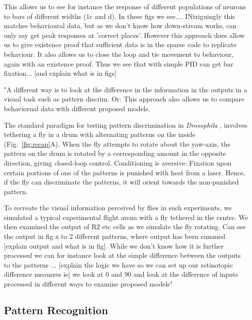 This allows us to see for instance the response of different populations of neurons to bars of different widths (1c and d). In these figs we see.... INtriguingly this matches behavioural data, 
but as we don't know how down-stream works, can only say get peak responses at 'correct places'. However this approach does allow us to give existence proof that 
sufficient data is in the sparse code to replicate behaviour. It also allows us to close the loop and tie movement to behaviour, again with an existence proof. 
Thus we see that with simple PID can get bar fixation... [and explain what is in figs]


"A different way is to look at the difference in the information in the outputs in a visual task such as pattern discrim. Or: This approach also allows us to compare behaviorual data 
with different proposed models.

The standard paradigm for testing pattern discrimination in \emph{Drosophila} \cite{Pan2009,Liu2006,Ernst1999,Dill1993}, involves tethering a fly in a drum with alternating patterns on the inside (Fig.~\ref{fig:recap}A).
When the fly attempts to rotate about the yaw-axis, the pattern on the drum is rotated by a corresponding amount in the opposite direction, giving closed-loop control.
Conditioning is aversive: Fixation upon certain portions of one of the patterns is punished with heat from a laser.
Hence, if the fly can discriminate the patterns, it will orient towards the non-punished pattern. 

To recreate the visual information perceived by flies in such experiments, we simulated a typical experimental flight arena with a fly tethered in the centre. We then examined the output of R2 etc 
cells as we simulate the fly rotating. Can see the output in fig x to 2 different patterns, where output has been summed [explain output and what is in fig]. 
While we don't know  how it is further processed we can for instance look at the simple difference between the outputs to the patterns ... [explain the logic we have so we can set up our retinotopic
difference meausres ie] we look at 0 and 90 and look at the difference of inputs processed in different ways to examine proposed models"

\subsection{Pattern Recognition}

